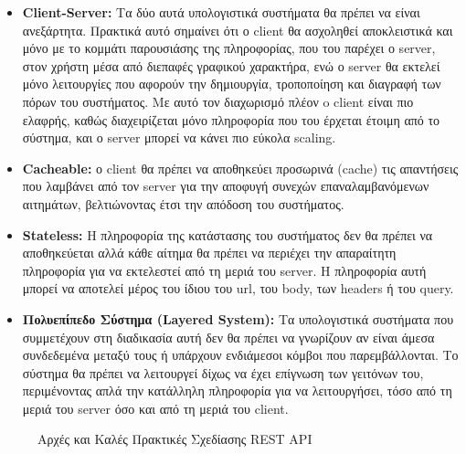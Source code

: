 \begin{itemize}
	\item \textbf{Client-Server:} Τα δύο αυτά υπολογιστικά συστήματα θα πρέπει να είναι ανεξάρτητα.
		Πρακτικά αυτό σημαίνει ότι ο client θα ασχοληθεί αποκλειστικά και μόνο με το κομμάτι παρουσιάσης της πληροφορίας, που του παρέχει ο server,
		στον χρήστη μέσα από διεπαφές γραφικού χαρακτήρα, ενώ ο server θα εκτελεί μόνο λειτουργίες που αφορούν την δημιουργία, τροποποίηση και διαγραφή των πόρων του
		συστήματος. Με αυτό τον διαχωρισμό πλέον o client είναι πιο ελαφρής, καθώς διαχειρίζεται μόνο πληροφορία που του έρχεται έτοιμη από το σύστημα,
		και ο server μπορεί να κάνει πιο εύκολα scaling.
	\item \textbf{Cacheable:} ο client θα πρέπει να αποθηκεύει προσωρινά (cache) τις
		απαντήσεις που λαμβάνει από τον server για την αποφυγή συνεχών επαναλαμβανόμενων αιτημάτων, βελτιώνοντας
		έτσι την απόδοση του συστήματος.
	\item \textbf{Stateless:} Η πληροφορία της κατάστασης του συστήματος δεν θα πρέπει να αποθηκεύεται
		αλλά κάθε αίτημα θα πρέπει να περιέχει την απαραίτητη πληροφορία για να εκτελεστεί από τη μεριά του server.
		Η πληροφορία αυτή μπορεί να αποτελεί μέρος του ίδιου του url, του body, των headers ή του query.
	\item \textbf{Πολυεπίπεδο Σύστημα (Layered System):} Τα υπολογιστικά συστήματα που συμμετέχουν στη διαδικασία αυτή δεν
		θα πρέπει να γνωρίζουν αν είναι άμεσα συνδεδεμένα μεταξύ τους ή υπάρχουν ενδιάμεσοι κόμβοι που παρεμβάλλονται.
		Το σύστημα θα πρέπει να λειτουργεί δίχως να έχει επίγνωση των γειτόνων του, περιμένοντας απλά την κατάλληλη πληροφορία για να
		λειτουργήσει, τόσο από τη μεριά του server όσο και από τη μεριά του client.
\end{itemize}

\begin{figure}[!ht]
	\centering
	\caption[Αρχές και Καλές Πρακτικές Σχεδίασης REST API]{Αρχές και Καλές Πρακτικές Σχεδίασης REST API}
	\label{fig:rest_principles}
\end{figure}